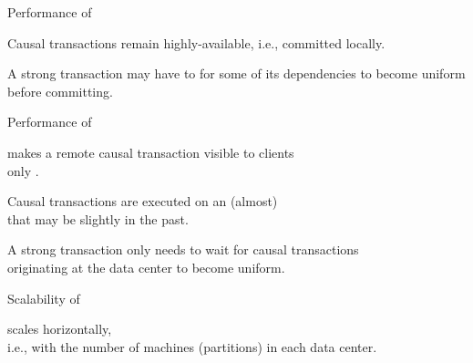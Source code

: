 \begin{frame}{Performance of \unistore}
  \begin{center}
    Causal transactions remain highly-available, i.e., committed locally. \\[6pt]

    \vspace{0.30cm}

    \vspace{0.20cm}
    A strong transaction may have to  for some of its dependencies
    to become uniform before committing.

    \pause
    \vspace{0.50cm}
  \end{center}
\end{frame}

\begin{frame}{Performance of \unistore{}}
  \begin{center}
    \unistore{} makes a remote causal transaction visible to clients \\[3pt]
    only .

    \vspace{0.30cm}
    Causal transactions are executed on an (almost) \\[3pt]
     that may be slightly in the past.

    \vspace{0.50cm}

    \pause
    A strong transaction only needs to wait for causal transactions \\[3pt]
    originating at the  data center to become uniform.
  \end{center}
\end{frame}

\begin{frame}{Scalability of \unistore}
  \begin{center}
    \unistore{} scales horizontally, \\[3pt]
    i.e., with the number of machines ({partitions}) in each data center.
  \end{center}
\end{frame}
